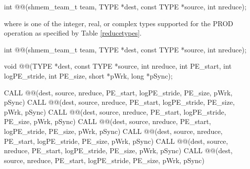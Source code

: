 \begin{apidefinition}
{\color{Green}
\begin{C11synopsis}
int @@(shmem_team_t team, TYPE *dest, const TYPE *source, int nreduce);
\end{C11synopsis}
where \TYPE{} is one of the integer, real, or complex types supported for the PROD operation as specified by Table \ref{reducetypes}.
}

\begin{Csynopsis}
\end{Csynopsis}
{\color{Green}
\begin{CsynopsisCol}
int @@(shmem_team_t team, TYPE *dest, const TYPE *source, int nreduce);
\end{CsynopsisCol}
}
\begin{DeprecateBlock}
\begin{CsynopsisCol}
void @@(TYPE *dest, const TYPE *source, int nreduce, int PE_start, int logPE_stride, int PE_size, short *pWrk, long *pSync);
\end{CsynopsisCol}
\end{DeprecateBlock}

\begin{Fsynopsis}
CALL @@(dest, source, nreduce, PE_start, logPE_stride, PE_size, pWrk, pSync)
CALL @@(dest, source, nreduce, PE_start, logPE_stride, PE_size, pWrk, pSync)
CALL @@(dest, source, nreduce, PE_start, logPE_stride, PE_size, pWrk, pSync)
CALL @@(dest, source, nreduce, PE_start, logPE_stride, PE_size, pWrk, pSync)
CALL @@(dest, source, nreduce, PE_start, logPE_stride, PE_size, pWrk, pSync)
CALL @@(dest, source, nreduce, PE_start, logPE_stride, PE_size, pWrk, pSync)
CALL @@(dest, source, nreduce, PE_start, logPE_stride, PE_size, pWrk, pSync)
\end{Fsynopsis}



\begin{apiarguments}



\end{apiarguments}
\end{apidefinition}
